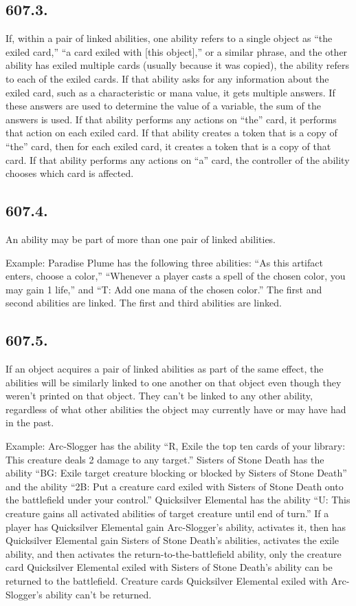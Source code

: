 \subsection*{607.3.}
If, within a pair of linked abilities, one ability refers to a single object as “the exiled card,” “a card exiled with [this object],” or a similar phrase, and the other ability has exiled multiple cards (usually because it was copied), the ability refers to each of the exiled cards. If that ability asks for any information about the exiled card, such as a characteristic or mana value, it gets multiple answers. If these answers are used to determine the value of a variable, the sum of the answers is used. If that ability performs any actions on “the” card, it performs that action on each exiled card. If that ability creates a token that is a copy of “the” card, then for each exiled card, it creates a token that is a copy of that card. If that ability performs any actions on “a” card, the controller of the ability chooses which card is affected.

\subsection*{607.4.}
An ability may be part of more than one pair of linked abilities.

Example: Paradise Plume has the following three abilities: “As this artifact enters, choose a color,” “Whenever a player casts a spell of the chosen color, you may gain 1 life,” and “{T}: Add one mana of the chosen color.” The first and second abilities are linked. The first and third abilities are linked.

\subsection*{607.5.}
If an object acquires a pair of linked abilities as part of the same effect, the abilities will be similarly linked to one another on that object even though they weren’t printed on that object. They can’t be linked to any other ability, regardless of what other abilities the object may currently have or may have had in the past.

Example: Arc-Slogger has the ability “{R}, Exile the top ten cards of your library: This creature deals 2 damage to any target.” Sisters of Stone Death has the ability “{B}{G}: Exile target creature blocking or blocked by Sisters of Stone Death” and the ability “{2}{B}: Put a creature card exiled with Sisters of Stone Death onto the battlefield under your control.” Quicksilver Elemental has the ability “{U}: This creature gains all activated abilities of target creature until end of turn.” If a player has Quicksilver Elemental gain Arc-Slogger’s ability, activates it, then has Quicksilver Elemental gain Sisters of Stone Death’s abilities, activates the exile ability, and then activates the return-to-the-battlefield ability, only the creature card Quicksilver Elemental exiled with Sisters of Stone Death’s ability can be returned to the battlefield. Creature cards Quicksilver Elemental exiled with Arc-Slogger’s ability can’t be returned.

